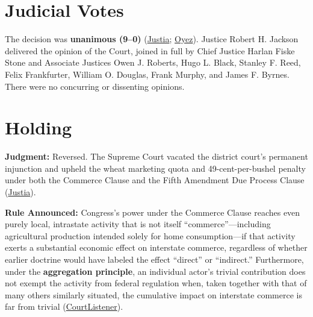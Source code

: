 \documentclass[12pt]{article}
\begin{document}
\section{Judicial Votes}

The decision was \textbf{unanimous (9--0)} (\href{https://supreme.justia.com/cases/federal/us/317/111/}{Justia}; \href{https://www.oyez.org/cases/1940-1955/317us111}{Oyez}). Justice Robert H. Jackson delivered the opinion of the Court, joined in full by Chief Justice Harlan Fiske Stone and Associate Justices Owen J. Roberts, Hugo L. Black, Stanley F. Reed, Felix Frankfurter, William O. Douglas, Frank Murphy, and James F. Byrnes. There were no concurring or dissenting opinions.

\section{Holding}

\textbf{Judgment:} Reversed. The Supreme Court vacated the district court's permanent injunction and upheld the wheat marketing quota and 49-cent-per-bushel penalty under both the Commerce Clause and the Fifth Amendment Due Process Clause (\href{https://supreme.justia.com/cases/federal/us/317/111/}{Justia}).

\textbf{Rule Announced:} Congress's power under the Commerce Clause reaches even purely local, intrastate activity that is not itself ``commerce''---including agricultural production intended solely for home consumption---if that activity exerts a substantial economic effect on interstate commerce, regardless of whether earlier doctrine would have labeled the effect ``direct'' or ``indirect.'' Furthermore, under the \textbf{aggregation principle}, an individual actor's trivial contribution does not exempt the activity from federal regulation when, taken together with that of many others similarly situated, the cumulative impact on interstate commerce is far from trivial (\href{https://www.courtlistener.com/opinion/103716/wickard-v-filburn/}{CourtListener}).
\end{document}
